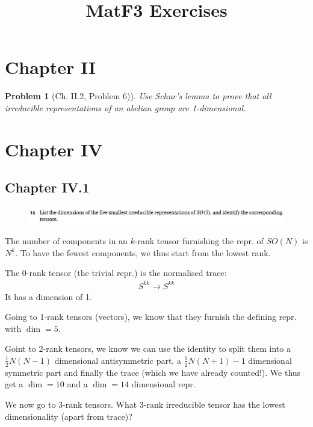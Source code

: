 \documentclass[a4paper]{article}
\title{MatF3 Exercises}
\theoremstyle{definition} %
\theoremstyle{plain} %
\newtheorem*{problem}{Problem}
\theoremstyle{remark} %
\begin{document}
    \maketitle

    \section*{Chapter II}
    \begin{problem}[Ch. II.2, Problem 6)]
        Use Schur's lemma to prove that all irreducible representations of an abelian group are 1-dimensional. 
    \end{problem}

    \section*{Chapter IV}
    \subsection*{Chapter IV.1}
    \begin{figure}[H]
        \centering
        \includegraphics[width=1\textwidth]{IV.1.12.png}
    \end{figure}

    The number of components in an \(k\)-rank tensor furnishing the repr. of \(SO(N)\) is \(N^k\). To have the fewest components, we thus start from the lowest rank.

    The 0-rank tensor (the trivial repr.) is the normalised trace:\begin{align*}
        S^{kk} \to S^{kk}   
    \end{align*}
    It has a dimension of 1.

    Going to 1-rank tensors (vectors), we know that they furnish the defining repr. with \(\dim = 5\).

    Goint to 2-rank tensors, we know we can use the identity to split them into a \(\frac{1}{2} N(N - 1)\) dimensional antisymmetric part, a \(\frac{1}{2} N(N + 1) - 1\) dimensional symmetric part and finally the trace (which we have already counted!). We thus get a \(\dim = 10\) and a \(\dim = 14\) dimensional repr.
    
    We now go to 3-rank tensors. What 3-rank irreducible tensor has the lowest dimensionality (apart from trace)? 
    
\end{document}
